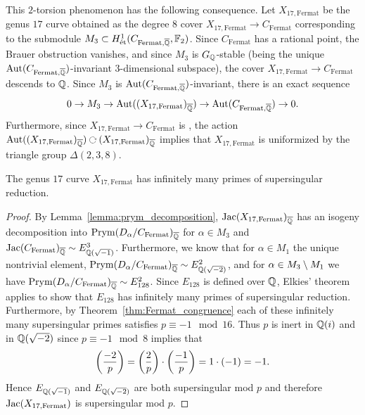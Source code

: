 \documentclass[main.tex]{subfiles}
\begin{document}
This $2$-torsion phenomenon has the following consequence. Let $X_{17, \mathrm{Fermat}}$ be the genus $17$ curve obtained as the degree $8$ \etale cover $X_{17, \mathrm{Fermat}} \to C_{\mathrm{Fermat}}$ corresponding to the submodule $M_3 \subset H^1_{\mathrm{\acute{e}t}}(C_{\mathrm{Fermat}, \overline{\mathbb{Q}}}, \mathbb{F}_2)$. Since $C_{\mathrm{Fermat}}$ has a rational point, the Brauer obstruction vanishes, and since $M_3$ is $G_{\mathbb{Q}}$-stable (being the unique $\operatorname{\mathrm{Aut}}(C_{\mathrm{Fermat}, \overline{\mathbb{Q}}})$-invariant $3$-dimensional subspace), the cover $X_{17, \mathrm{Fermat}} \to C_{\mathrm{Fermat}}$ descends to $\mathbb{Q}$. Since $M_3$ is $\operatorname{\mathrm{Aut}}(C_{\mathrm{Fermat}, \overline{\mathbb{Q}}})$-invariant, there is an exact sequence
\[ 0 \to M_3 \to \operatorname{\mathrm{Aut}}((X_{17, \mathrm{Fermat}})_{\overline{\mathbb{Q}}}) \to \operatorname{\mathrm{Aut}}(C_{\mathrm{Fermat}, \overline{\mathbb{Q}}}) \to 0. \]
Furthermore, since $X_{17, \mathrm{Fermat}} \to C_{\mathrm{Fermat}}$ is \etale, the action $\Aut((X_{17, \mathrm{Fermat}})_{\ol{\Q}}) \acts (X_{17, \mathrm{Fermat}})_{\ol{\Q}}$ implies that $X_{17, \mathrm{Fermat}}$ is uniformized by the triangle group $\Delta(2,3,8)$.

\begin{cor}
The genus $17$ curve $X_{17, \mathrm{Fermat}}$ has infinitely many primes of supersingular reduction.
\end{cor}

\begin{proof}
By Lemma~\ref{lemma:prym_decomposition}, $\operatorname{\mathrm{Jac}}(X_{17, \mathrm{Fermat}})_{\overline{\mathbb{Q}}}$ has an isogeny decomposition into $\operatorname{\mathrm{Prym}}(D_{\alpha}/C_{\mathrm{Fermat}})_{\overline{\mathbb{Q}}}$ for $\alpha \in M_3$ and $\operatorname{\mathrm{Jac}}(C_{\mathrm{Fermat}})_{\overline{\mathbb{Q}}} \sim E_{\mathbb{Q}(\sqrt{-1})}^3$. Furthermore, we know that for $\alpha \in M_1$ the unique nontrivial element, $\operatorname{\mathrm{Prym}}(D_{\alpha}/C_{\mathrm{Fermat}})_{\overline{\mathbb{Q}}} \sim E_{\mathbb{Q}(\sqrt{-2})}^2$, and for $\alpha \in M_3 \setminus M_1$ we have $\operatorname{\mathrm{Prym}}(D_{\alpha}/C_{\mathrm{Fermat}})_{\overline{\mathbb{Q}}} \sim E_{128}^2$. Since $E_{128}$ is defined over $\mathbb{Q}$, Elkies' theorem applies to show that $E_{128}$ has infinitely many primes of supersingular reduction. Furthermore, by Theorem~\ref{thm:Fermat_congruence} each of these infinitely many supersingular primes satisfies $p \equiv -1 \mod 16$. Thus $p$ is inert in $\mathbb{Q}(i)$ and in $\mathbb{Q}(\sqrt{-2})$ since $p \equiv -1 \mod 8$ implies that
\[ \left(\frac{-2}{p}\right) = \left(\frac{2}{p}\right) \cdot \left(\frac{-1}{p}\right) = 1 \cdot (-1) = -1. \] 
Hence $E_{\mathbb{Q}(\sqrt{-1})}$ and $E_{\mathbb{Q}(\sqrt{-2})}$ are both supersingular mod $p$ and therefore $\operatorname{\mathrm{Jac}}(X_{17, \mathrm{Fermat}})$ is supersingular mod $p$.
\end{proof}
\end{document}
